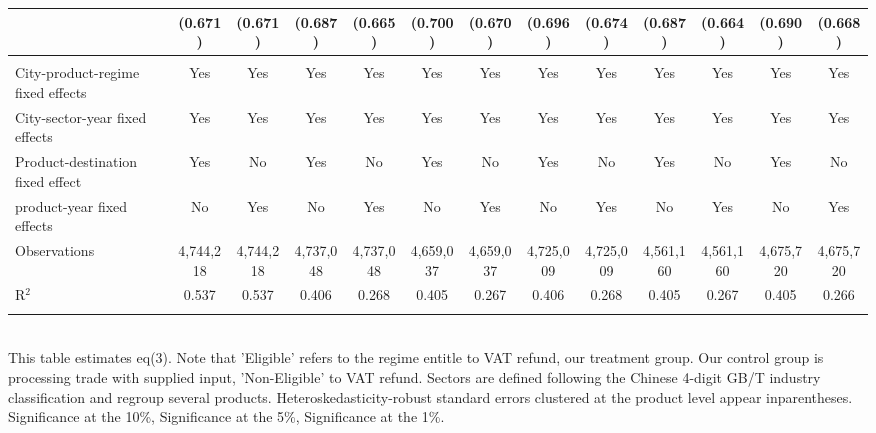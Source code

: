 \documentclass[preview]{standalone}
\begin{document}
\begin{table}[!htbp]
\begin{adjustbox}{width=\textwidth, totalheight=\baselineskip,keepaspectratio}
\begin{tabular}{@{\extracolsep{5pt}}lcccccccccccc}
  & (0.671) & (0.671) & (0.687) & (0.665) & (0.700) & (0.670) & (0.696) & (0.674) & (0.687) & (0.664) & (0.690) & (0.668) \\ 
 \hline \\[-1.8ex] 
City-product-regime fixed effects & Yes & Yes & Yes & Yes & Yes & Yes & Yes & Yes & Yes & Yes & Yes & Yes \\ 
City-sector-year fixed effects & Yes & Yes & Yes & Yes & Yes & Yes & Yes & Yes & Yes & Yes & Yes & Yes \\ 
Product-destination fixed effect & Yes & No & Yes & No & Yes & No & Yes & No & Yes & No & Yes & No \\ 
product-year fixed effects & No & Yes & No & Yes & No & Yes & No & Yes & No & Yes & No & Yes \\ 
Observations & 4,744,218 & 4,744,218 & 4,737,048 & 4,737,048 & 4,659,037 & 4,659,037 & 4,725,009 & 4,725,009 & 4,561,160 & 4,561,160 & 4,675,720 & 4,675,720 \\ 
R$^{2}$ & 0.537 & 0.537 & 0.406 & 0.268 & 0.405 & 0.267 & 0.406 & 0.268 & 0.405 & 0.267 & 0.405 & 0.266 \\ 
\hline 
\hline \\[-1.8ex] 
\end{tabular}
\end{adjustbox}
\begin{tablenotes} 
 \small 
 \item \\ 

This table estimates eq(3). 
Note that 'Eligible' refers to the regime entitle to VAT refund, our treatment group.
Our control group is processing trade with supplied input, 'Non-Eligible' to VAT refund.
Sectors are defined following the Chinese 4-digit GB/T industry
classification and regroup several products.
Heteroskedasticity-robust standard errors
clustered at the product level appear inparentheses.
\sym{*} Significance at the 10\%, \sym{**} Significance at the 5\%, \sym{***} Significance at the 1\%. 
\end{tablenotes}
\end{table}
\end{document}
